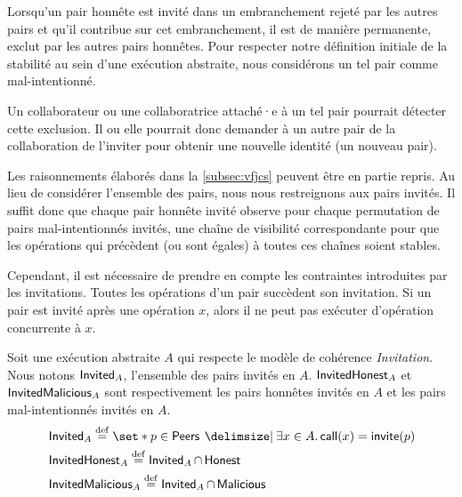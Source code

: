 Lorsqu'un pair honnête est invité dans un embranchement rejeté par les autres pairs et qu'il contribue sur cet embranchement, il est de manière permanente, exclut par les autres pairs honnêtes.
Pour respecter notre définition initiale de la stabilité au sein d'une exécution abstraite, nous considérons un tel pair comme mal-intentionné.

Un collaborateur ou une collaboratrice attaché·e à un tel pair pourrait détecter cette exclusion.
Il ou elle pourrait donc demander à un autre pair de la collaboration de l'inviter pour obtenir une nouvelle identité (un nouveau pair).

Les raisonnements élaborés dans la \autoref{subsec:vfjcs} peuvent être en partie repris.
Au lieu de considérer l'ensemble des pairs, nous nous restreignons aux pairs invités.
Il suffit donc que chaque pair honnête invité observe pour chaque permutation de pairs mal-intentionnés invités, une chaîne de visibilité correspondante pour que les opérations qui précèdent (ou sont égales) à toutes ces chaînes soient stables.

Cependant, il est nécessaire de prendre en compte les contraintes introduites par les invitations.
Toutes les opérations d'un pair succèdent son invitation.
Si un pair est invité après une opération $x$, alors il ne peut pas exécuter d'opération concurrente à $x$.


\begin{definition}[Invités]\label{def:invited}
Soit une exécution abstraite $A$ qui respecte le modèle de cohérence \emph{Invitation}.
Nous notons $\operatorname{\mathsf{Invited}}_A$, l'ensemble des pairs invités en $A$.
$\operatorname{\mathsf{InvitedHonest}}_A$ et $\operatorname{\mathsf{InvitedMalicious}}_A$ sont respectivement les pairs honnêtes invités en $A$ et les pairs mal-intentionnés invités en $A$.
\begin{align*}
&\trm{Invited}_A \defeq \set*{p \in \trm{Peers} \given \exists x \in A \qsep \trm{call}(x) = \trm{invite}(p)}\\
&\trm{InvitedHonest}_A \defeq \trm{Invited}_A \cap \trm{Honest}\\
&\trm{InvitedMalicious}_A \defeq \trm{Invited}_A \cap \trm{Malicious}
\end{align*}
\end{definition}


